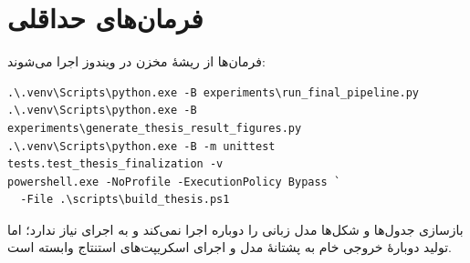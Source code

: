 \section*{فرمان‌های حداقلی}

فرمان‌ها از ریشۀ مخزن در ویندوز اجرا می‌شوند:

\begin{latin}
\footnotesize
\begin{verbatim}
.\.venv\Scripts\python.exe -B experiments\run_final_pipeline.py
.\.venv\Scripts\python.exe -B experiments\generate_thesis_result_figures.py
.\.venv\Scripts\python.exe -B -m unittest tests.test_thesis_finalization -v
powershell.exe -NoProfile -ExecutionPolicy Bypass `
  -File .\scripts\build_thesis.ps1
\end{verbatim}
\end{latin}

بازسازی جدول‌ها و شکل‌ها مدل زبانی را دوباره اجرا نمی‌کند و به اجرای  نیاز ندارد؛ اما تولید دوبارۀ خروجی خام به پشتانۀ مدل و اجرای اسکریپت‌های استنتاج وابسته است.
